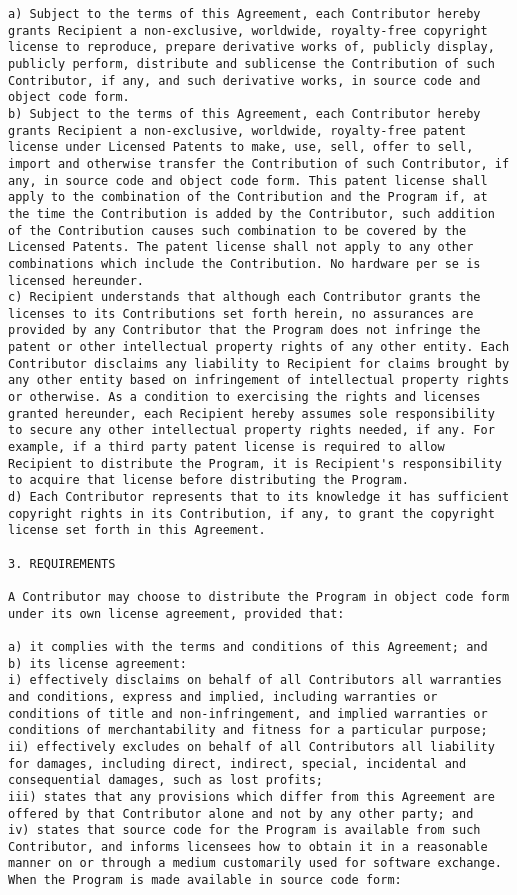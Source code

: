 \begin{verbatim}
a) Subject to the terms of this Agreement, each Contributor hereby
grants Recipient a non-exclusive, worldwide, royalty-free copyright
license to reproduce, prepare derivative works of, publicly display,
publicly perform, distribute and sublicense the Contribution of such
Contributor, if any, and such derivative works, in source code and
object code form. 
b) Subject to the terms of this Agreement, each Contributor hereby
grants Recipient a non-exclusive, worldwide, royalty-free patent
license under Licensed Patents to make, use, sell, offer to sell,
import and otherwise transfer the Contribution of such Contributor, if
any, in source code and object code form. This patent license shall
apply to the combination of the Contribution and the Program if, at
the time the Contribution is added by the Contributor, such addition
of the Contribution causes such combination to be covered by the
Licensed Patents. The patent license shall not apply to any other
combinations which include the Contribution. No hardware per se is
licensed hereunder. 
c) Recipient understands that although each Contributor grants the
licenses to its Contributions set forth herein, no assurances are
provided by any Contributor that the Program does not infringe the
patent or other intellectual property rights of any other entity. Each
Contributor disclaims any liability to Recipient for claims brought by
any other entity based on infringement of intellectual property rights
or otherwise. As a condition to exercising the rights and licenses
granted hereunder, each Recipient hereby assumes sole responsibility
to secure any other intellectual property rights needed, if any. For
example, if a third party patent license is required to allow
Recipient to distribute the Program, it is Recipient's responsibility
to acquire that license before distributing the Program. 
d) Each Contributor represents that to its knowledge it has sufficient
copyright rights in its Contribution, if any, to grant the copyright
license set forth in this Agreement.  

3. REQUIREMENTS 

A Contributor may choose to distribute the Program in object code form
under its own license agreement, provided that:  

a) it complies with the terms and conditions of this Agreement; and
b) its license agreement:
i) effectively disclaims on behalf of all Contributors all warranties
and conditions, express and implied, including warranties or
conditions of title and non-infringement, and implied warranties or
conditions of merchantability and fitness for a particular purpose;  
ii) effectively excludes on behalf of all Contributors all liability
for damages, including direct, indirect, special, incidental and
consequential damages, such as lost profits;  
iii) states that any provisions which differ from this Agreement are
offered by that Contributor alone and not by any other party; and 
iv) states that source code for the Program is available from such
Contributor, and informs licensees how to obtain it in a reasonable
manner on or through a medium customarily used for software exchange. 
When the Program is made available in source code form: 


\end{verbatim}
